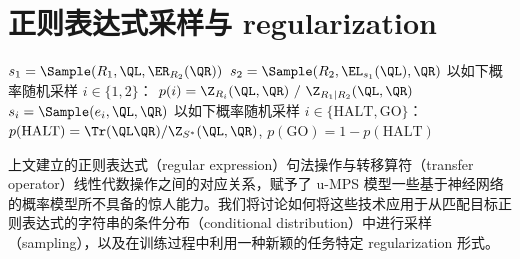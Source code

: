 \section{正则表达式采样与 regularization}
\label{sec:sampling}
%
\begin{algorithm}[tb]
\caption{u-MPS 的正则表达式采样算法}
\label{alg:sampling}
\begin{algorithmic}
   \hspace{4.0em}
    \State{}
   \hspace{0.0em}
    \State $s_1 = \Sample(R_1, \QL, \ER_{R_2}(\QR))$
    \State $s_2 = \Sample(R_2, \EL_{s_1}(\QL), \QR)$
    \State{}
   \hspace{-0.2em}
    \State 以如下概率随机采样 $i \in \{1, 2\}$：
    \State \hspace{0.7cm} $p(i) = \Z_{R_i}(\QL, \QR) \ / \ \Z_{R_1 | R_2}(\QL, \QR)$
    \State $s_i = \Sample(e_i, \QL, \QR)$
    \State{}
   \hspace{1.0em}
    \State 以如下概率随机采样 $i \in \{\textrm{HALT}, \textrm{GO}\}$：
    \State \hspace{0.7cm} $p(\textrm{HALT}) = \Tr(\QL \QR) / \Z_{S^*}(\QL, \QR)$,
    \State \hspace{0.7cm} $p(\textrm{GO}) = 1 - p(\textrm{HALT})$
     \hspace{0.0em} 
      \State\Return{$\varepsilon$}
    \Else \hspace{6.0em} 
      \State{}
    \EndIf
  \EndIf
\EndFunction
\end{algorithmic}
\end{algorithm}
%
上文建立的正则表达式（regular expression）句法操作与转移算符（transfer operator）线性代数操作之间的对应关系，赋予了 u-MPS 模型一些基于神经网络的概率模型所不具备的惊人能力。我们将讨论如何将这些技术应用于从匹配目标正则表达式的字符串的条件分布（conditional distribution）中进行采样（sampling），以及在训练过程中利用一种新颖的任务特定 regularization 形式。

